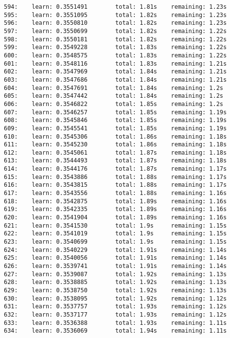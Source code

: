 \documentclass[11pt]{article}
\begin{document}
\begin{Verbatim}[commandchars=\\\{\}]
594:    learn: 0.3551491        total: 1.81s    remaining: 1.23s
595:    learn: 0.3551095        total: 1.82s    remaining: 1.23s
596:    learn: 0.3550810        total: 1.82s    remaining: 1.23s
597:    learn: 0.3550699        total: 1.82s    remaining: 1.22s
598:    learn: 0.3550181        total: 1.82s    remaining: 1.22s
599:    learn: 0.3549228        total: 1.83s    remaining: 1.22s
600:    learn: 0.3548575        total: 1.83s    remaining: 1.22s
601:    learn: 0.3548116        total: 1.83s    remaining: 1.21s
602:    learn: 0.3547969        total: 1.84s    remaining: 1.21s
603:    learn: 0.3547686        total: 1.84s    remaining: 1.21s
604:    learn: 0.3547691        total: 1.84s    remaining: 1.2s
605:    learn: 0.3547442        total: 1.84s    remaining: 1.2s
606:    learn: 0.3546822        total: 1.85s    remaining: 1.2s
607:    learn: 0.3546257        total: 1.85s    remaining: 1.19s
608:    learn: 0.3545846        total: 1.85s    remaining: 1.19s
609:    learn: 0.3545541        total: 1.85s    remaining: 1.19s
610:    learn: 0.3545306        total: 1.86s    remaining: 1.18s
611:    learn: 0.3545230        total: 1.86s    remaining: 1.18s
612:    learn: 0.3545061        total: 1.87s    remaining: 1.18s
613:    learn: 0.3544493        total: 1.87s    remaining: 1.18s
614:    learn: 0.3544176        total: 1.87s    remaining: 1.17s
615:    learn: 0.3543886        total: 1.88s    remaining: 1.17s
616:    learn: 0.3543815        total: 1.88s    remaining: 1.17s
617:    learn: 0.3543556        total: 1.88s    remaining: 1.16s
618:    learn: 0.3542875        total: 1.89s    remaining: 1.16s
619:    learn: 0.3542335        total: 1.89s    remaining: 1.16s
620:    learn: 0.3541904        total: 1.89s    remaining: 1.16s
621:    learn: 0.3541530        total: 1.9s     remaining: 1.15s
622:    learn: 0.3541019        total: 1.9s     remaining: 1.15s
623:    learn: 0.3540699        total: 1.9s     remaining: 1.15s
624:    learn: 0.3540229        total: 1.91s    remaining: 1.14s
625:    learn: 0.3540056        total: 1.91s    remaining: 1.14s
626:    learn: 0.3539741        total: 1.91s    remaining: 1.14s
627:    learn: 0.3539087        total: 1.92s    remaining: 1.13s
628:    learn: 0.3538885        total: 1.92s    remaining: 1.13s
629:    learn: 0.3538750        total: 1.92s    remaining: 1.13s
630:    learn: 0.3538095        total: 1.92s    remaining: 1.12s
631:    learn: 0.3537757        total: 1.93s    remaining: 1.12s
632:    learn: 0.3537177        total: 1.93s    remaining: 1.12s
633:    learn: 0.3536388        total: 1.93s    remaining: 1.11s
634:    learn: 0.3536069        total: 1.94s    remaining: 1.11s

\end{Verbatim}
\end{document}
